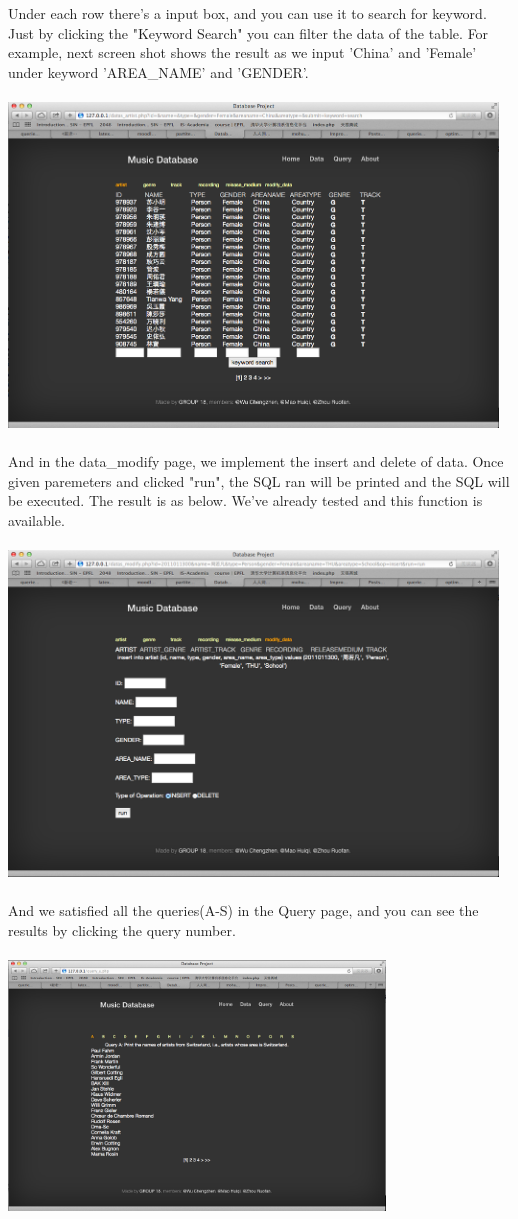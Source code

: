 \documentclass[11pt]{article} %
\begin{document}
{Under each row there's a input box, and you can use it to search for keyword. Just by clicking the "Keyword Search" you can filter the data of the table. For example, next screen shot shows the result as we input 'China' and 'Female' under keyword 'AREA\_NAME' and 'GENDER'. \\ \\
\includegraphics[width=13cm]{interface3}\\ \\
And in the data\_modify page, we implement the insert and delete of data. Once given paremeters and clicked "run", the SQL ran will be printed and the SQL will be executed. The result is as below. We've already tested and this function is available.\\ \\
\includegraphics[width=13cm]{interface5}\\ \\
And we satisfied all the queries(A-S) in the Query page, and you can see the results by clicking the query number.\\ \\
\includegraphics[width=10cm]{interface4}\\ \\
}
\end{document}
